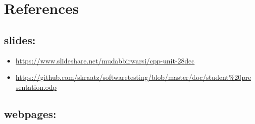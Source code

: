 \documentclass[10pt,a4paper,onecolumn,notitlepage]{article}
\begin{document}
\section*{References}
\subsection*{slides:}
\begin{itemize}
\item \hyperref[https://www.slideshare.net/mudabbirwarsi/cpp-unit-28dec]{https://www.slideshare.net/mudabbirwarsi/cpp-unit-28dec}
\item \hyperref[https://github.com/skraatz/softwaretesting/blob/master/doc/student\%20presentation.odp]{https://github.com/skraatz/softwaretesting/blob/master/doc/student\%20presentation.odp}
\end{itemize}
\subsection*{webpages:}
\end{document}
